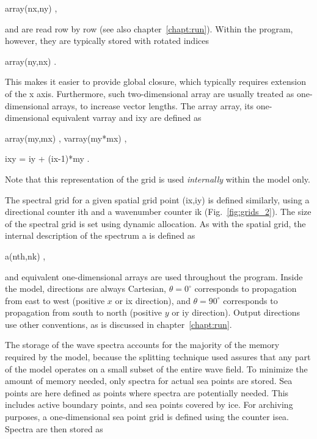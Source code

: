 \vspace{\baselineskip} \centerline{\F array(nx,ny) ,} \vspace{\baselineskip}

\noindent
and are read row by row (see also chapter~\ref{chapt:run}). Within the
program, however, they are typically stored with rotated indices

\vspace{\baselineskip} \centerline{\F array(ny,nx) .} \vspace{\baselineskip}

\noindent
This makes it easier to provide global closure, which typically requires
extension of the x axis. Furthermore, such two-dimensional array are usually
treated as one-dimensional arrays, to increase vector lengths. The array {\F
array}, its one-dimensional equivalent {\F varray} and {\F ixy} are defined as

\vspace{\baselineskip}
\centerline{\F array(my,mx) , varray(my*mx) ,}
\centerline{\F ixy = iy + (ix-1)*my .}
\vspace{\baselineskip}

\noindent
Note that this representation of the grid is used {\it internally} within the
model only.



The spectral grid for a given spatial grid point {\F (ix,iy)} is defined
similarly, using a directional counter {\F ith} and a wavenumber counter {\F
ik} (Fig.~\ref{fig:grids_2}). The size of the spectral grid is set using
dynamic allocation. As with the spatial grid, the internal description of the
spectrum {\F a} is defined as

\vspace{\baselineskip}
\centerline{\F a(nth,nk) ,}
\vspace{\baselineskip}

\noindent
and equivalent one-dimensional arrays are used throughout the program. Inside
the model, directions are always Cartesian, $\theta = 0^\circ$ corresponds to
propagation from east to west (positive $x$ or {\F ix} direction), and $\theta
= 90^\circ$ corresponds to propagation from south to north (positive $y$ or
{\F iy} direction). Output directions use other conventions, as is discussed
in chapter~\ref{chapt:run}.

The storage of the wave spectra accounts for the majority of the memory
required by the model, because the splitting technique used assures that any
part of the model operates on a small subset of the entire wave field. To
minimize the amount of memory needed, only spectra for actual sea points are
stored. Sea points are here defined as points where spectra are potentially
needed. This includes active boundary points, and sea points covered by
ice. For archiving purposes, a one-dimensional sea point grid is defined using
the counter {\F isea}. Spectra are then stored as

